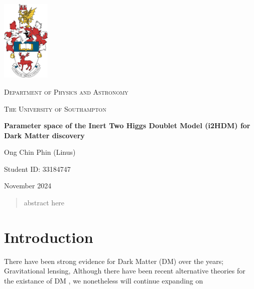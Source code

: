 \documentclass[12pt]{article}
\begin{document}
\begin{titlepage}
    \centering
    \includegraphics[width=2.3cm]{crest.jpg}\par
    \vspace{1cm}
    {\scshape\Large Department of Physics and Astronomy \par}
    \vspace{1cm}
    {\scshape\Large The University of Southampton \par}
    \vspace{1cm}
    \vspace{1cm}
    {\huge\bfseries Parameter space of the Inert Two Higgs Doublet Model (i2HDM) for Dark Matter discovery\par}
    \vspace{1cm}
    {\Large Ong Chin Phin (Linus) \par}
    \vspace{1cm}
    {\Large Student ID: 33184747 \par}
    \vfill
    {\large November 2024 \par}
\end{titlepage}

\newpage
\tableofcontents
\thispagestyle{empty}

\newpage
\thispagestyle{empty}
\begin{abstract}
abstract here
\end{abstract}

\newpage
\setcounter{page}{1}
\section{Introduction}
\label{sec:introduction}
There have been strong evidence for Dark Matter (DM) over the years; Gravitational lensing, %
Although there have been recent alternative theories for the existance of DM \cite{Gupta_2023, Gupta_2024}, we nonetheless will continue expanding on 
\end{document}
